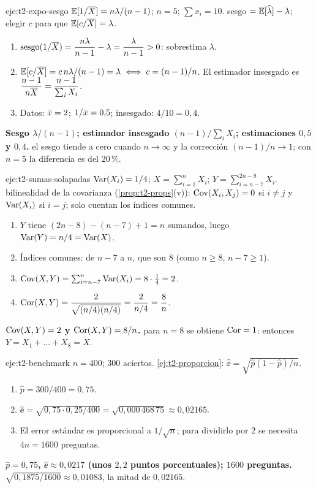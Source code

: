 \begin{solucion}{eje:t2-expo-sesgo}
\datos $\mathbb{E}[1/\overline{X}]=n\lambda/(n-1)$; $n=5$; $\sum x_i=10$.
\planteamiento sesgo $=\mathbb{E}[\widehat\lambda]-\lambda$; elegir $c$ para que $\mathbb{E}[c/\overline{X}]=\lambda$.
\pasos
\begin{enumerate}[label=\arabic*.]
  \item $\operatorname{sesgo}(1/\overline{X})=\dfrac{n\lambda}{n-1}-\lambda=\dfrac{\lambda}{n-1}>0$: sobrestima $\lambda$.
  \item $\mathbb{E}[c/\overline{X}]=c\,n\lambda/(n-1)=\lambda\iff c=(n-1)/n$. El estimador insesgado es $\dfrac{n-1}{n\overline{X}}=\dfrac{n-1}{\sum_iX_i}$.
  \item Datos: $\bar{x}=2$; $1/\bar{x}=0{,}5$; insesgado: $4/10=0{,}4$.
\end{enumerate}
\resultado \textbf{Sesgo $\lambda/(n-1)$; estimador insesgado $(n-1)/\sum_iX_i$; estimaciones $0{,}5$ y $0{,}4$.}
\comprobacion el sesgo tiende a cero cuando $n\to\infty$ y la corrección $(n-1)/n\to1$; con $n=5$ la diferencia es del $20\,\%$.
\end{solucion}

\begin{solucion}{eje:t2-sumas-solapadas}
\datos $\operatorname{Var}(X_i)=1/4$; $X=\sum_{i=1}^{n}X_i$; $Y=\sum_{i=n-7}^{2n-8}X_i$.
\planteamiento bilinealidad de la covarianza (\cref{prop:t2-props}(v)): $\operatorname{Cov}(X_i,X_j)=0$ si $i\ne j$ y $\operatorname{Var}(X_i)$ si $i=j$; solo cuentan los índices comunes.
\pasos
\begin{enumerate}[label=\arabic*.]
  \item $Y$ tiene $(2n-8)-(n-7)+1=n$ sumandos, luego $\operatorname{Var}(Y)=n/4=\operatorname{Var}(X)$.
  \item Índices comunes: de $n-7$ a $n$, que son $8$ (como $n\ge8$, $n-7\ge1$).
  \item $\operatorname{Cov}(X,Y)=\sum_{i=n-7}^{n}\operatorname{Var}(X_i)=8\cdot\frac14=2$.
  \item $\operatorname{Cor}(X,Y)=\dfrac{2}{\sqrt{(n/4)(n/4)}}=\dfrac{2}{n/4}=\dfrac8n$.
\end{enumerate}
\resultado \textbf{$\operatorname{Cov}(X,Y)=2$ y $\operatorname{Cor}(X,Y)=8/n$.}
\comprobacion para $n=8$ se obtiene $\operatorname{Cor}=1$: entonces $Y=X_1+\dots+X_8=X$.
\end{solucion}

\begin{solucion}{eje:t2-benchmark}
\datos $n=400$; $300$ aciertos.
\planteamiento \cref{ej:t2-proporcion}: $\widehat{\ee}=\sqrt{\widehat p(1-\widehat p)/n}$.
\pasos
\begin{enumerate}[label=\arabic*.]
  \item $\widehat p=300/400=0{,}75$.
  \item $\widehat{\ee}=\sqrt{0{,}75\cdot0{,}25/400}=\sqrt{0{,}000\,468\,75}\approx0{,}02165$.
  \item El error estándar es proporcional a $1/\sqrt n$; para dividirlo por $2$ se necesita $4n=1600$ preguntas.
\end{enumerate}
\resultado \textbf{$\widehat p=0{,}75$, $\widehat{\ee}\approx0{,}0217$ (unos $2{,}2$ puntos porcentuales); $1600$ preguntas.}
\comprobacion $\sqrt{0{,}1875/1600}\approx0{,}01083$, la mitad de $0{,}02165$.
\end{solucion}

